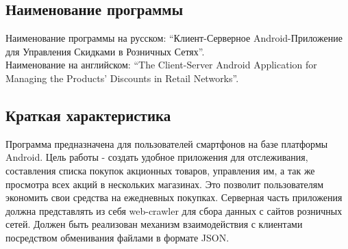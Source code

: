 \subsection{Наименование программы}
Наименование программы на русском: 
``Клиент-Серверное Android-Приложение для Управления Скидками в Розничных Сетях''. \\
Наименование на английском: 
``The Client-Server Android Application for Managing the Products' Discounts in Retail Networks''. \\


\subsection{Краткая характеристика} 
Программа предназначена для пользователей смартфонов на базе платформы
Android.  Цель работы - создать удобное приложения для отслеживания,
составления списка покупок акционных товаров, управления им, а так же
просмотра всех акций в нескольких магазинах. Это позволит пользователям
экономить свои средства на ежедневных покупках.  Серверная часть
приложения должна представлять из себя web-crawler для сбора данных с
сайтов розничных сетей. Должен быть реализован механизм взаимодействия с
клиентами посредством обменивания файлами в формате JSON.


